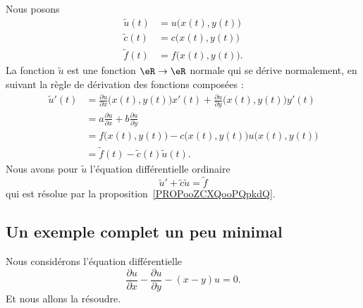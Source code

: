 Nous posons
\begin{subequations}
    \begin{align}
        \tilde u(t)&=u\big( x(t),y(t) \big)\\
        \tilde c(t)&=c\big( x(t),y(t) \big)\\
        \tilde f(t)&=f\big( x(t),y(t) \big).
    \end{align}
\end{subequations}
La fonction \( \tilde u\) est une fonction \( \eR\to \eR\) normale qui se dérive normalement, en suivant la règle de dérivation des fonctions composées :
\begin{subequations}
    \begin{align}
    \tilde u'(t)&=\frac{ \partial u }{ \partial x }\big( x(t),y(t) \big)x'(t)+\frac{ \partial u }{ \partial y }\big( x(t),y(t) \big)y'(t)\\
    &=a\frac{ \partial u }{ \partial x }+b\frac{ \partial u }{ \partial y }\\
    &=f\big( x(t),y(t) \big)-c\big( x(t),y(t) \big)u\big( x(t),y(t) \big)\\
    &=\tilde f(t)-\tilde c(t)\tilde u(t).
    \end{align}
\end{subequations}
Nous avons pour \( \tilde u\) l'équation différentielle ordinaire
\begin{equation}
    \tilde u'+\tilde c\tilde u=\tilde f
\end{equation}
qui est résolue par la proposition~\ref{PROPooZCXQooPQpkdQ}.

\subsection{Un exemple complet un peu minimal}

Nous considérons l'équation différentielle\cite{ooEIHMooRXOzwa}
\begin{equation}
    \frac{ \partial u }{ \partial x }-\frac{ \partial u }{ \partial y }-(x-y)u=0.
\end{equation}
Et nous allons la résoudre.

